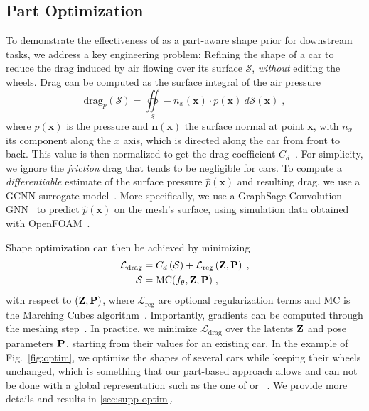 \subsection{Part Optimization}
\label{sec:exp-optim}

To demonstrate the effectiveness of \PSDF{} as a part-aware shape prior for downstream tasks, we address a key engineering problem: Refining the shape of a car to reduce the drag induced by air flowing over its surface $\mathcal{S}$, \textit{without} editing the wheels. Drag can be computed as the surface integral of the air pressure
%
\begin{equation} \label{eq:p-drag}
	\text{drag}_p(\mathcal{S}) = \oiint\limits_\mathcal{S} -n_x(\mathbf{x}) \cdot p(\mathbf{x}) \ d\mathcal{S}(\mathbf{x}) \; ,
\end{equation}
%
where $p(\mathbf{x})$ is the pressure and $\mathbf{n}(\mathbf{x})$ the surface normal at point $\mathbf{x}$, with $n_x$ its component along the $x$ axis, which is directed along the car from front to back. This value is then normalized to get the drag coefficient $C_d$~\cite{Munson13}. For simplicity, we ignore the \textit{friction} drag that tends to be negligible for cars.
To compute a \textit{differentiable} estimate of the surface pressure $\hat{p}(\mathbf{x})$ and resulting drag, we use a GCNN surrogate model~\cite{Baque18}. More specifically, we use a GraphSage Convolution GNN~\cite{Hamilton17, Bonnet22} to predict $\hat{p}(\mathbf{x})$ on the mesh's surface, using simulation data obtained with OpenFOAM~\cite{OpenFoam}. 

Shape optimization can then be achieved by minimizing
%
\begin{align} \label{eq:optim}
	\mathcal{L}_\text{drag} &=  C_d\left(\mathcal{S}\right) + \mathcal{L}_\text{reg}\left( \mathbf{Z}, \mathbf{P}\right) \; , \\ 
	\mathcal{S} & = \text{MC}(f_\theta, \mathbf{Z}, \mathbf{P}) \; , \nonumber 
\end{align}
%
with respect to $\left(\mathbf{Z},\mathbf{P}\right)$, where $\mathcal{L}_\text{reg}$ are optional regularization terms and $\text{MC}$ is the Marching Cubes algorithm~\cite{Lewiner03}. Importantly, gradients can be computed through the meshing step~\cite{Remelli20b}. 
%
In practice, we minimize $\mathcal{L}_\text{drag}$ over the \PSDF{} latents $\mathbf{Z}$ and pose parameters $\mathbf{P}$, starting from their values for an existing car. In the example of Fig.~\ref{fig:optim}, we optimize the shapes of several cars while keeping their wheels unchanged, which is something that our part-based approach allows and can not be done with a global representation such as the one of \DSDFp{} or \VecSet{}~\cite{Zhang23d}.  We provide more details and results in \cref{sec:supp-optim}.


